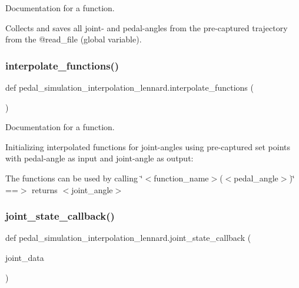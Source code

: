 Documentation for a function. 

Collects and saves all joint-\/ and pedal-\/angles from the pre-\/captured trajectory from the @read\+\_\+file (global variable). \mbox{\label{namespacepedal__simulation__interpolation__lennard_ae9c9788cdc89b6581cd2a587ef85282c}} 
\subsubsection{\texorpdfstring{interpolate\_functions()}{interpolate\_functions()}}
{\footnotesize\ttfamily def pedal\+\_\+simulation\+\_\+interpolation\+\_\+lennard.\+interpolate\+\_\+functions (\begin{DoxyParamCaption}{ }\end{DoxyParamCaption})}



Documentation for a function. 

Initializing interpolated functions for joint-\/angles using pre-\/captured set points with pedal-\/angle as input and joint-\/angle as output\+:

The functions can be used by calling \char`\"{}$<$function\+\_\+name$>$($<$pedal\+\_\+angle$>$)\char`\"{} ==$>$ returns $<$joint\+\_\+angle$>$ \mbox{\label{namespacepedal__simulation__interpolation__lennard_a735569bc5de68e16c821e5775ce86006}} 
\subsubsection{\texorpdfstring{joint\_state\_callback()}{joint\_state\_callback()}}
{\footnotesize\ttfamily def pedal\+\_\+simulation\+\_\+interpolation\+\_\+lennard.\+joint\+\_\+state\+\_\+callback (\begin{DoxyParamCaption}\item[{}]{joint\+\_\+data }\end{DoxyParamCaption})}



